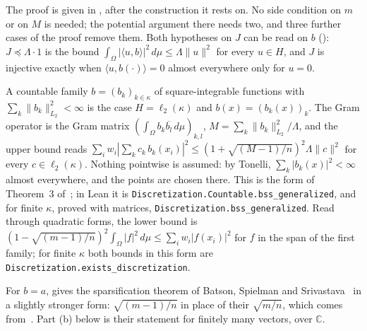 The proof is given in , after the construction it rests on. No side
condition on $m$ or on $M$ is needed; the potential argument there needs two, and three
further cases of the proof remove them. Both hypotheses on $J$ can be read on $b$
(): $J \preceq \Lambda \cdot 1$ is the bound
$\int_\Omega |\langle u, b \rangle|^2 \, d\mu \leq \Lambda \|u\|^2$ for every $u \in H$, and
$J$ is injective exactly when $\langle u, b(\cdot) \rangle = 0$ almost everywhere only for
$u = 0$.

\begin{remark}
\label{rem:countable-family}
A countable family $b = (b_k)_{k \in \kappa}$ of square-integrable functions with
$\sum_k \|b_k\|_{L_2}^2 < \infty$ is the case $H = \ell_2(\kappa)$ and
$b(x) = (b_k(x))_k$. The Gram operator is the Gram matrix
$(\int_\Omega b_k \overline{b_l} \, d\mu)_{k,l}$, $M = \sum_k \|b_k\|_{L_2}^2 / \Lambda$, and
the upper bound reads
$\sum_i w_i |\sum_k c_k \, b_k(x_i)|^2 \leq (1 + \sqrt{(M-1)/n})^2 \Lambda \|c\|^2$ for every
$c \in \ell_2(\kappa)$. Nothing pointwise is assumed: by Tonelli,
$\sum_k |b_k(x)|^2 < \infty$ almost everywhere, and the points are chosen there. This is
the form of Theorem~3 of~\cite{CDKU}; in Lean it is
\texttt{Discretization.Countable.bss\_generalized}, and for finite $\kappa$, proved with
matrices, \texttt{Discretization.bss\_generalized}. Read through quadratic forms, the lower
bound is $(1 - \sqrt{(m-1)/n})^2 \int_\Omega |f|^2 \, d\mu \leq \sum_i w_i |f(x_i)|^2$ for
$f$ in the span of the first family; for finite $\kappa$ both bounds in this form are
\texttt{Discretization.exists\_discretization}.
\end{remark}

For $b = a$,  gives the sparsification theorem of Batson,
Spielman and Srivastava~\cite{BSS} in a slightly stronger form: $\sqrt{(m-1)/n}$ in place
of their $\sqrt{m/n}$, which comes from~\cite{CDKU}. Part (b) below is their statement for
finitely many vectors, over $\mathbb{C}$.

